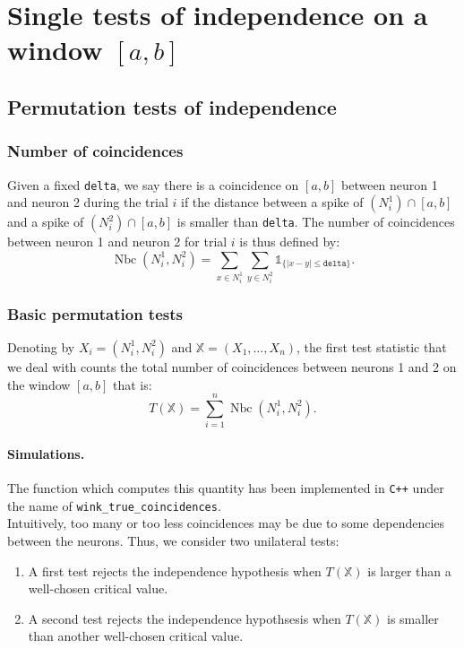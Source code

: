 \documentclass[a4paper,oneside,10pt]{article}
\newcommand{\Nbc}{\operatorname{Nbc}}
\newcommand{\X}{\ensuremath{\mathds{X}}}
\newcommand{\1}[1]{\ensuremath{\mathds{1}_{\{ #1 \}}}}  %
\begin{document}
\section{Single tests of independence on a window $[a,b]$}

\subsection{Permutation tests of independence}

\subsubsection{Number of coincidences}

Given a fixed  \texttt{delta}, we say there is a coincidence on $[a,b]$ between neuron 1 and neuron 2 during the trial $i$ if the distance between a spike of $(N^1_i)\cap [a,b]$ and a spike of $(N^2_i)\cap[a,b]$ is smaller than \texttt{delta}.
The number of coincidences between neuron 1 and neuron 2 for trial $ i$ is thus defined by:
$$\Nbc(N^1_i,N^2_i)=\sum_{x\in N^1_i}\sum_{y\in N^2_i} \1{|x-y|\leq \texttt{delta}}.$$

\subsubsection{Basic permutation tests}

Denoting by $X_i=(N^1_i,N^2_i)$ and $\X=(X_1,\ldots,X_n)$, the first test statistic that we deal with counts the total number of coincidences between neurons 1 and 2 on the window $[a,b]$ that is:
$$T(\X)=\sum_{i=1}^n \Nbc(N^1_i,N^2_i).$$

\paragraph{Simulations.} The function which computes this quantity has been implemented in \texttt{C++} under the name of \texttt{wink\_true\_coincidences}.\\


Intuitively, too many or too less coincidences may be due to some dependencies between the neurons. Thus, we consider two unilateral tests:
\begin{enumerate}
\item A first test rejects the independence hypothesis when $T(\X)$ is larger than a well-chosen critical value.
\item A second test rejects the independence hypothsesis when $T(\X)$ is smaller than another well-chosen critical value.
\end{enumerate}
\end{document}
